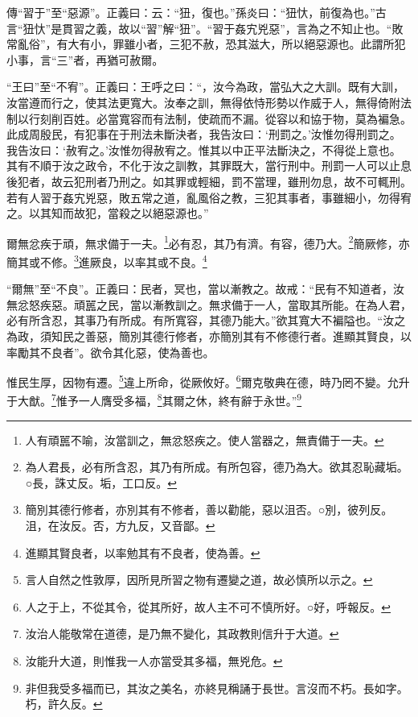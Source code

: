 {\noindent\zhuan{}\fzbyks 傳“習于”至“惡源”。正義曰：云：“狃，復也。”孫炎曰：“狃忕，前復為也。”古言“狃忕”是貫習之義，故以“習”解“狃”。“習于姦宄兇惡”，言為之不知止也。“敗常亂俗”，有大有小，罪雖小者，三犯不赦，恐其滋大，所以絕惡源也。此謂所犯小事，言“三”者，再猶可赦爾。 \par}

{\noindent\shu{}\fzkt “王曰”至“不宥”。正義曰：王呼之曰：“，汝今為政，當弘大之大訓。既有大訓，汝當遵而行之，使其法更寬大。汝奉之訓，無得依恃形勢以作威于人，無得倚附法制以行刻削百姓。必當寬容而有法制，使疏而不漏。從容以和協于物，莫為褊急。此成周殷民，有犯事在于刑法未斷決者，我告汝曰：‘刑罰之。’汝惟勿得刑罰之。我告汝曰：‘赦宥之。’汝惟勿得赦宥之。惟其以中正平法斷決之，不得從上意也。其有不順于汝之政令，不化于汝之訓教，其罪既大，當行刑中。刑罰一人可以止息後犯者，故云犯刑者乃刑之。如其罪或輕細，罰不當理，雖刑勿息，故不可輒刑。若有人習于姦宄兇惡，敗五常之道，亂風俗之教，三犯其事者，事雖細小，勿得宥之。以其知而故犯，當殺之以絕惡源也。” \par}

爾無忿疾于頑，無求備于一夫。\footnote{人有頑嚚不喻，汝當訓之，無忿怒疾之。使人當器之，無責備于一夫。}必有忍，其乃有濟。有容，德乃大。\footnote{為人君長，必有所含忍，其乃有所成。有所包容，德乃為大。欲其忍恥藏垢。○長，誅丈反。垢，工口反。}簡厥修，亦簡其或不修。\footnote{簡別其德行修者，亦別其有不修者，善以勸能，惡以沮否。○別，彼列反。沮，在汝反。否，方九反，又音鄙。}進厥良，以率其或不良。\footnote{進顯其賢良者，以率勉其有不良者，使為善。}

{\noindent\shu{}\fzkt “爾無”至“不良”。正義曰：民者，冥也，當以漸教之。故戒：“民有不知道者，汝無忿怒疾惡。頑嚚之民，當以漸教訓之。無求備于一人，當取其所能。在為人君，必有所含忍，其事乃有所成。有所寬容，其德乃能大。”欲其寬大不褊隘也。“汝之為政，須知民之善惡，簡別其德行修者，亦簡別其有不修德行者。進顯其賢良，以率勵其不良者”。欲令其化惡，使為善也。 \par}

惟民生厚，因物有遷。\footnote{言人自然之性敦厚，因所見所習之物有遷變之道，故必慎所以示之。}違上所命，從厥攸好。\footnote{人之于上，不從其令，從其所好，故人主不可不慎所好。○好，呼報反。}爾克敬典在德，時乃罔不變。允升于大猷。\footnote{汝治人能敬常在道德，是乃無不變化，其政教則信升于大道。}惟予一人膺受多福，\footnote{汝能升大道，則惟我一人亦當受其多福，無兇危。}其爾之休，終有辭于永世。”\footnote{非但我受多福而已，其汝之美名，亦終見稱誦于長世。言沒而不朽。長如字。朽，許久反。}

